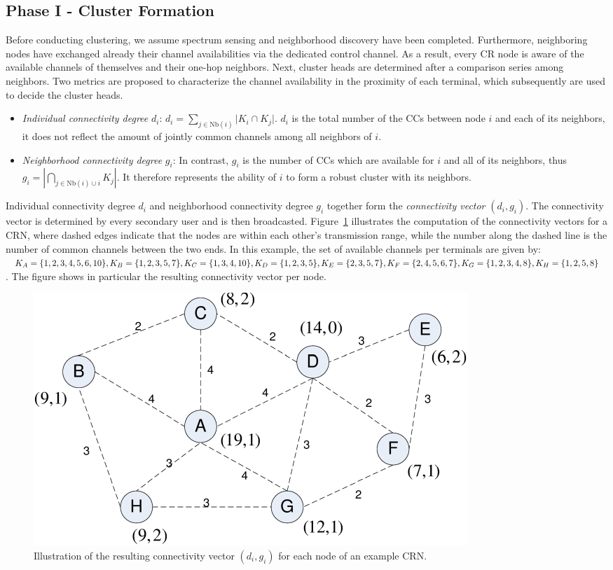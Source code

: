 \documentclass[times]{ettauth}
\theoremstyle{mytheoremstyle}
\theoremstyle{mytheoremstyle}
\theoremstyle{mytheoremstyle}
\begin{document}
\subsection{Phase I - Cluster Formation}
\label{phaseI}
Before conducting clustering, we assume spectrum sensing and neighborhood discovery have been completed.
Furthermore, neighboring nodes have exchanged already their channel availabilities via the dedicated control channel. 
As a result, every CR node is aware of the available channels of themselves and their one-hop neighbors.
Next, cluster heads are determined after a comparison series among neighbors.
Two metrics are proposed to characterize the channel availability in the proximity of each terminal, which subsequently are used to decide the cluster heads.
\begin{itemize}
\item \textit{Individual connectivity degree} $d_i$: $d_i=\sum_{j\in \text{Nb}(i)}\vert K_i\cap K_j\vert$. 
$d_i$ is the total number of the CCs between node $i$ and each of its neighbors, it does not reflect the amount of jointly common channels among all neighbors of $i$.
\item \textit{Neighborhood connectivity degree} $g_i$: In contrast, $g_i$ is the number of CCs which are available for $i$ and all of its neighbors, thus
$g_i=|\bigcap_{j\in \text{Nb}(i)\cup i}K_j|$. It therefore represents the ability of $i$ to form a robust cluster with its neighbors.
\end{itemize}
Individual connectivity degree $d_i$ and neighborhood connectivity degree $g_i$ together form the \textit{connectivity vector} $(d_i, g_i)$.
The connectivity vector is determined by every secondary user and is then broadcasted.
Figure~\ref{fig1} illustrates the computation of the connectivity vectors for a CRN, where dashed edges indicate that the nodes are within each other's transmission range, while the number along the dashed line is the number of common channels between the two ends.
In this example, the set of available channels per terminals are given by: $K_A=\{1,2,3,4,5,6,10\}, K_B=\{1,2,3,5,7\}, \\K_C=\{1,3,4,10\}, K_D=\{1,2,3,5\}, \\K_E=\{2,3,5,7\}, K_F=\{2,4,5,6,7\}, \\K_G=\{1,2,3,4,8\}, K_H=\{1,2,5,8\}$. 
The figure shows in particular the resulting connectivity vector per node.
\begin{figure}[ht!]
  \centering
\includegraphics[width=0.7\linewidth]{figure1.pdf}
	\caption{Illustration of the resulting connectivity vector $(d_i, g_i)$ for each node of an example CRN.}
	\label{fig1}
\end{figure}
\end{document}

